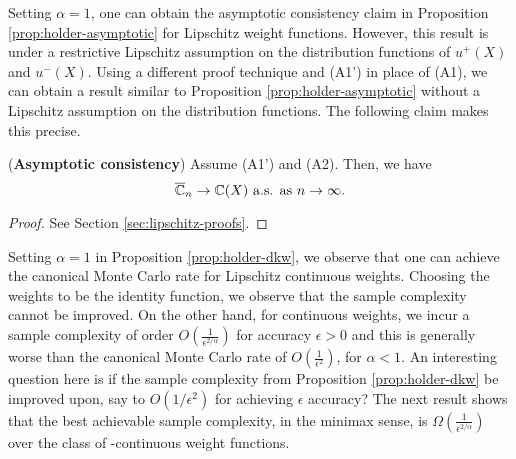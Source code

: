
Setting $\alpha=1$, one can obtain the asymptotic consistency claim in Proposition \ref{prop:holder-asymptotic} for Lipschitz weight functions. However, this result is under  a restrictive Lipschitz assumption on the distribution functions of $u^+(X)$ and $u^-(X)$. Using a different proof technique and (A1') in place of (A1), we can obtain a result similar to Proposition \ref{prop:holder-asymptotic} without a Lipschitz assumption on the distribution functions. The following claim makes this precise.

\begin{proposition}(\textbf{Asymptotic consistency})
\label{prop:lipschitz}
Assume (A1') and (A2). Then, we have 
$$\overline {\mathbb{C}}_n
\rightarrow
\mathbb{C}(X)
 \text{   a.s. as } n\rightarrow \infty.
$$
\end{proposition}
\begin{proof}
See Section \ref{sec:lipschitz-proofs}.
\end{proof}

Setting $\alpha=1$ in Proposition \ref{prop:holder-dkw}, we observe that one can achieve the canonical Monte Carlo rate for Lipschitz continuous weights. Choosing the weights to be the identity function, we observe that the sample complexity cannot be improved.
 On the other hand, for \holder continuous weights, we incur a sample complexity of order $O\left(\frac1{\epsilon^{2/\alpha}}\right)$ for accuracy $\epsilon>0$ and this is generally worse than the canonical Monte Carlo rate of $O\left(\frac1{\epsilon^2}\right)$, for $\alpha < 1$. 
An interesting question here is if the sample complexity from Proposition \ref{prop:holder-dkw} be improved upon, say to $O(1/\epsilon^2)$ for achieving $\epsilon$ accuracy? The next result shows that the best achievable sample complexity, in the minimax sense, is $\Omega\left(\frac{1}{\epsilon^{2/\alpha}}\right)$ over the class of \holderNS-continuous weight functions. 

